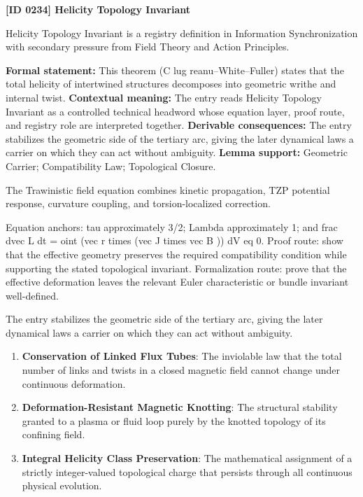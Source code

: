 \clearpage
\noindent\textbf{[ID 0234] Helicity Topology Invariant}\par
\vspace{0.35em}
\begingroup\small
{}
Helicity Topology Invariant is a registry definition in Information Synchronization with secondary pressure from Field Theory and Action Principles.

\begingroup\footnotesize\setlength{\emergencystretch}{3em}\sloppy
\textbf{Formal statement:} This theorem (C lug reanu--White--Fuller) states that the total helicity of intertwined structures decomposes into geometric writhe and internal twist. \textbf{Contextual meaning:} The entry reads Helicity Topology Invariant as a controlled technical headword whose equation layer, proof route, and registry role are interpreted together. \textbf{Derivable consequences:} The entry stabilizes the geometric side of the tertiary arc, giving the later dynamical laws a carrier on which they can act without ambiguity. \textbf{Lemma support:} Geometric Carrier; Compatibility Law; Topological Closure.\par
\endgroup

The Trawinistic field equation combines kinetic propagation, TZP potential response, curvature coupling, and torsion-localized correction.

Equation anchors: tau approximately 3/2; Lambda approximately 1; and frac dvec L dt = oint (vec r times (vec J times vec B )) dV eq 0. Proof route: show that the effective geometry preserves the required compatibility condition while supporting the stated topological invariant. Formalization route: prove that the effective deformation leaves the relevant Euler characteristic or bundle invariant well-defined.

The entry stabilizes the geometric side of the tertiary arc, giving the later dynamical laws a carrier on which they can act without ambiguity.
\endgroup

\begin{enumerate}[leftmargin=1.6em,itemsep=6pt,topsep=4pt]
\item \textbf{Conservation of Linked Flux Tubes}: The inviolable law that the total number of links and twists in a closed magnetic field cannot change under continuous deformation.
\item \textbf{Deformation-Resistant Magnetic Knotting}: The structural stability granted to a plasma or fluid loop purely by the knotted topology of its confining field.
\item \textbf{Integral Helicity Class Preservation}: The mathematical assignment of a strictly integer-valued topological charge that persists through all continuous physical evolution.
\end{enumerate}

